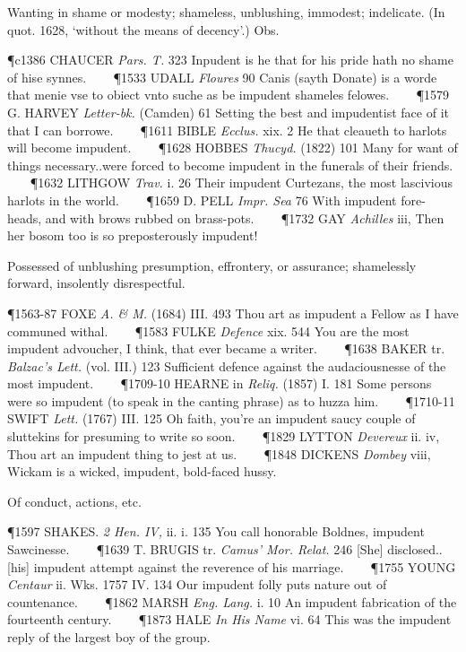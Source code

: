 \begin{description}[wide, labelwidth=!, labelindent=0pt]
\begin{myenumerate}

 Wanting in shame or modesty; shameless, unblushing, immodest; indelicate. (In quot. 1628, ‘without the means of decency’.) Obs.

\P c1386 CHAUCER  \textit{Pars. T.} 323 Inpudent is he that for his pride hath no shame of hise synnes.    
\P 1533 UDALL  \textit{Floures} 90 Canis (sayth Donate) is a worde that menie vse to obiect vnto suche as be impudent shameles felowes.    
\P 1579 G. HARVEY  \textit{Letter-bk.} (Camden) 61 Setting the best and impudentist face of it that I can borrowe.    
\P 1611 BIBLE  \textit{Ecclus.} xix. 2 He that cleaueth to harlots will become impudent.    
\P 1628 HOBBES  \textit{Thucyd.} (1822) 101 Many for want of things necessary..were forced to become impudent in the funerals of their friends.    
\P 1632 LITHGOW  \textit{Trav.} i. 26 Their impudent Curtezans, the most lascivious harlots in the world.    
\P 1659 D. PELL  \textit{Impr. Sea} 76 With impudent fore-heads, and with brows rubbed on brass-pots.    
\P 1732 GAY  \textit{Achilles} iii, Then her bosom too is so preposterously impudent!

 Possessed of unblushing presumption, effrontery, or assurance; shamelessly forward, insolently disrespectful.

\P 1563-87 FOXE  \textit{A. \& M.} (1684) III. 493 Thou art as impudent a Fellow as I have communed withal.    
\P 1583 FULKE  \textit{Defence} xix. 544 You are the most impudent advoucher, I think, that ever became a writer.    
\P 1638 BAKER tr.  \textit{Balzac's Lett.} (vol. III.) 123 Sufficient defence against the audaciousnesse of the most impudent.    
\P 1709-10 HEARNE in  \textit{Reliq.} (1857) I. 181 Some persons were so impudent (to speak in the canting phrase) as to huzza him.    
\P 1710-11 SWIFT  \textit{Lett.} (1767) III. 125 Oh faith, you're an impudent saucy couple of sluttekins for presuming to write so soon.    
\P 1829 LYTTON  \textit{Devereux} ii. iv, Thou art an impudent thing to jest at us.    
\P 1848 DICKENS  \textit{Dombey} viii, Wickam is a wicked, impudent, bold-faced hussy.

 Of conduct, actions, etc.

\P 1597 SHAKES.  \textit{2 Hen. IV,} ii. i. 135 You call honorable Boldnes, impudent Sawcinesse.    
\P 1639 T. BRUGIS tr.  \textit{Camus' Mor. Relat.} 246 [She] disclosed..[his] impudent attempt against the reverence of his marriage.    
\P 1755 YOUNG  \textit{Centaur} ii. Wks. 1757 IV. 134  Our impudent folly puts nature out of countenance.    
\P 1862 MARSH  \textit{Eng. Lang.} i. 10 An impudent fabrication of the fourteenth century.    
\P 1873 HALE  \textit{In His Name} vi. 64 This was the impudent reply of the largest boy of the group.


\end{myenumerate}
\end{description}
